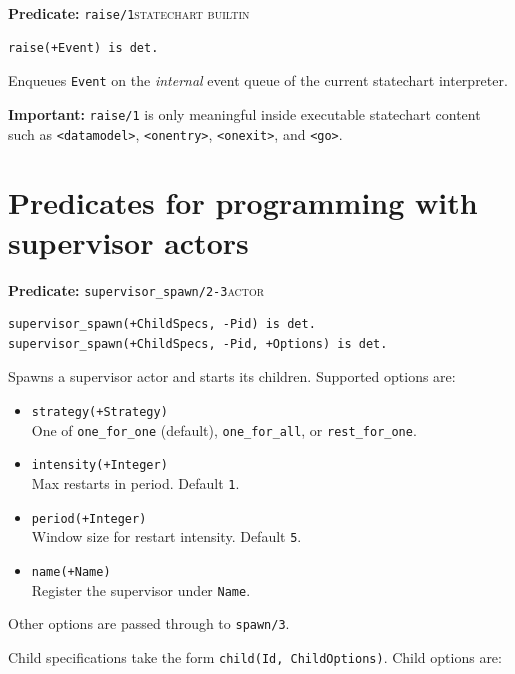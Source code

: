 \bigskip
\noindent \textbf{Predicate:} \texttt{raise/1}\hfill\textsc{statechart builtin}

\begin{verbatim}
raise(+Event) is det.
\end{verbatim}

\noindent Enqueues \texttt{Event} on the \textit{internal} event queue of the
current statechart interpreter.

\medskip
\noindent \textbf{Important:} \texttt{raise/1} is only meaningful inside
executable statechart content such as \texttt{<datamodel>},
\texttt{<onentry>}, \texttt{<onexit>}, and \texttt{<go>}.\\

\section{Predicates for programming with supervisor actors}\label{sec:supervisor-api}

\noindent \textbf{Predicate:} \texttt{supervisor\_spawn/2-3}\hfill\textsc{actor}

\begin{verbatim}
supervisor_spawn(+ChildSpecs, -Pid) is det.
supervisor_spawn(+ChildSpecs, -Pid, +Options) is det.
\end{verbatim}

\noindent Spawns a supervisor actor and starts its children. Supported options
are:

\begin{itemize}
\item
  \texttt{strategy(+Strategy)}\\
  One of \texttt{one\_for\_one} (default), \texttt{one\_for\_all}, or
  \texttt{rest\_for\_one}.
\item
  \texttt{intensity(+Integer)}\\
  Max restarts in period. Default \texttt{1}.
\item
  \texttt{period(+Integer)}\\
  Window size for restart intensity. Default \texttt{5}.
\item
  \texttt{name(+Name)}\\
  Register the supervisor under \texttt{Name}.
\end{itemize}

\noindent Other options are passed through to \texttt{spawn/3}.

\medskip
\noindent Child specifications take the form \texttt{child(Id, ChildOptions)}.
Child options are:

